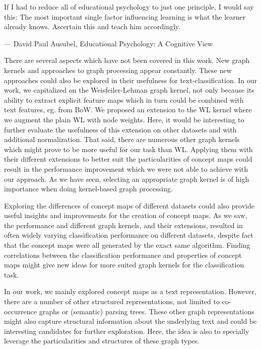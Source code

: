 

\epigraph{If I had to reduce all of educational psychology to just one principle, I would say this: The most important single factor influencing learning is what the learner already knows. Ascertain this and teach him accordingly.}{--- \textup{David Paul Ausubel}, Educational Psychology: A Cognitive View \cite{Ausubel1968}}

There are several aspects which have not been covered in this work.
New graph kernels and approaches to graph processing appear constantly.
These new approaches could also be explored in their usefulness for text-classification.
In our work, we capitalized on the Weisfeiler-Lehman graph kernel, not only because its ability to extract explicit feature maps which in turn could be combined with text features, eg. from BoW.
We proposed an extension to the WL kernel where we augment the plain WL with node weights. Here, it would be interesting to further evaluate the usefulness of this extension on other datasets and with additional normalization.
That said, there are numerous other graph kernels which might prove to be more useful for our task than WL.
Applying them with their different extensions to better suit the particularities of concept maps could result in the performance improvement which we were not able to achieve with our approach.
As we have seen, selecting an appropriate graph kernel is of high importance when doing kernel-based graph processing.

Exploring the differences of concept maps of different datasets could also provide useful insights and improvements for the creation of concept maps.
As we saw, the performance and different graph kernels, and their extensions, resulted in often widely varying classification performance on different datasets, despite fact that the concept maps were all generated by the exact same algorithm.
Finding correlations between the classification performance and properties of concept maps might give new ideas for more suited graph kernels for the classification task.

In our work, we mainly explored concept maps as a text representation.
However, there are a number of other structured representations, not limited to co-occurrence graphs or (semantic) parsing trees.
These other graph representations might also capture structural information about the underlying text and could be interesting candidates for further exploration.
Here, the idea is also to specially leverage the particularities and structures of these graph types.

